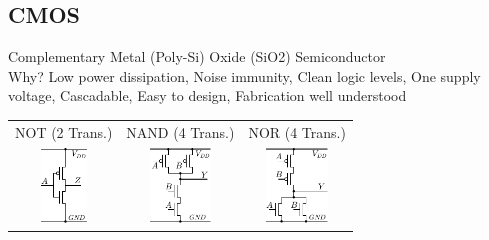 \begin{sectionbox}
	\subsection{CMOS}
	Complementary Metal (Poly-Si) Oxide (SiO2) Semiconductor\\		%
	Why? Low power dissipation, Noise immunity, Clean logic levels, One supply voltage, Cascadable, Easy to design, Fabrication well understood

		\begin{tabular}{ccc}
			NOT (2 Trans.) & NAND (4 Trans.) & NOR (4 Trans.)\\
			\includegraphics[height = 2cm]{./img/mosfet_not.pdf} \quad & \includegraphics[height = 2cm]{./img/mosfet_nand.pdf} \quad & \includegraphics[height = 2cm]{./img/mosfet_nor.pdf} \\
		\end{tabular}
\end{sectionbox}


